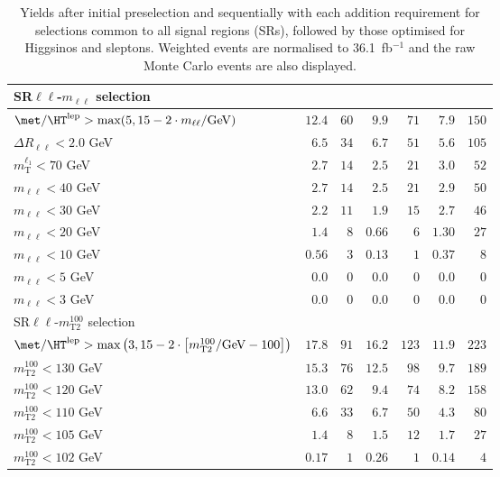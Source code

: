 \begin{table}
\begin{center}
\begin{tabular*}{\textwidth}{@{\extracolsep{\fill}}lrrrrrr}
\midrule
SR$\ell\ell$-$m_{\ell\ell}$ selection &  &  & \\ 
\midrule
$\met / \HT^\text{lep} > \text{max}(5, 15-2\cdot m_{\ell\ell}/\text{GeV})$ & $12.4$ & $60$    & $9.9$ & $71$    & $7.9$ & $150$   \\ 
    $\Delta R_{\ell\ell} < 2.0$ GeV & $6.5$ & $34$    & $6.7$ & $51$    & $5.6$ & $105$   \\ 
    $m_\text{T}^{\ell_1} < 70$ GeV & $2.7$ & $14$    & $2.5$ & $21$    & $3.0$ & $52$   \\ 
    $m_{\ell\ell} < 40$ GeV & $2.7$ & $14$    & $2.5$ & $21$    & $2.9$ & $50$   \\ 
    $m_{\ell\ell} < 30$ GeV & $2.2$ & $11$    & $1.9$ & $15$    & $2.7$ & $46$   \\ 
    $m_{\ell\ell} < 20$ GeV & $1.4$ & $8$    & $0.66$ & $6$    & $1.30$ & $27$   \\ 
    $m_{\ell\ell} < 10$ GeV & $0.56$ & $3$    & $0.13$ & $1$    & $0.37$ & $8$   \\ 
    $m_{\ell\ell} < 5$ GeV & $0.0$ & $0$    & $0.0$ & $0$    & $0.0$ & $0$   \\ 
    $m_{\ell\ell} < 3$ GeV & $0.0$ & $0$    & $0.0$ & $0$    & $0.0$ & $0$   \\ 
    \midrule
SR$\ell\ell$-$m_\text{T2}^{100}$ selection &  &  & \\ 
\midrule
$\met / \HT^\text{lep} > \text{max}\left(3, 15-2\cdot \left[m_\text{T2}^{100}/\text{GeV} - 100\right]\right)$ & $17.8$ & $91$    & $16.2$ & $123$    & $11.9$ & $223$   \\ 
    $m_\text{T2}^{100} < 130$ GeV & $15.3$ & $76$    & $12.5$ & $98$    & $9.7$ & $189$   \\ 
    $m_\text{T2}^{100} < 120$ GeV & $13.0$ & $62$    & $9.4$ & $74$    & $8.2$ & $158$   \\ 
    $m_\text{T2}^{100} < 110$ GeV & $6.6$ & $33$    & $6.7$ & $50$    & $4.3$ & $80$   \\ 
    $m_\text{T2}^{100} < 105$ GeV & $1.4$ & $8$    & $1.5$ & $12$    & $1.7$ & $27$   \\ 
    $m_\text{T2}^{100} < 102$ GeV & $0.17$ & $1$    & $0.26$ & $1$    & $0.14$ & $4$   \\ 
    
  \bottomrule
  \end{tabular*}
\end{center}
\caption{ Yields after initial preselection and sequentially with each addition requirement 
for selections common to all signal regions (SRs), 
followed by those optimised for Higgsinos and sleptons. 
Weighted events are normalised to 36.1~fb$^{-1}$ and the raw Monte Carlo events are also displayed.
}
\label{tab:cutflow_NUHM2}
\end{table} 
  